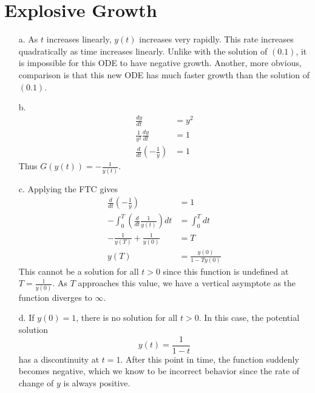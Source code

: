 \documentclass{article}
\begin{document}
\section{Explosive Growth}
\begin{enumerate}
	\item[a.]
		As $t$ increases linearly, $y(t)$ increases very rapidly. This rate increases quadratically as time increases linearly. Unlike with the solution of $(0.1)$, it is impossible for this ODE to have negative growth. Another, more obvious, comparison is that this new ODE has much faster growth than the solution of $(0.1)$.
	
	\item[b.]
		\begin{align*}
			\frac{d y}{d t} &= y^2 \\
			\frac{1}{y^2} \frac{d y}{d t} &= 1 \\
			\frac{d }{d t} \left( - \frac{1}{y} \right) &= 1
		\end{align*}
		Thus $G(y(t)) = -\frac{1}{y(t)}$.
	
	\item[c.]
		Applying the FTC gives
		\begin{align*}
			\frac{d }{d t} \left( - \frac{1}{y} \right) &= 1 \\
			-\int_{0}^{T} \left( \frac{d }{d t} \frac{1}{y(t)} \right) dt  &= \int_{0}^{T} dt \\
			-\frac{1}{y(T)} + \frac{1}{y(0)} &= T \\
			y(T) &= \frac{y(0)}{1 - T y(0)}
		\end{align*}
		This cannot be a solution for all $t > 0$ since this function is undefined at $T = \frac{1}{y(0)}$. As $T$ approaches this value, we have a vertical asymptote as the function diverges to $\infty$.

	\item[d.]
		If $y(0) = 1$, there is no solution for all $t > 0$. In this case, the potential solution
		\[
			y(t) = \frac{1}{1 - t}
		\] 
		has a discontinuity at $t=1$. After this point in time, the function suddenly becomes negative, which we know to be incorrect behavior since the rate of change of $y$ is always positive.
\end{enumerate}
\end{document}
